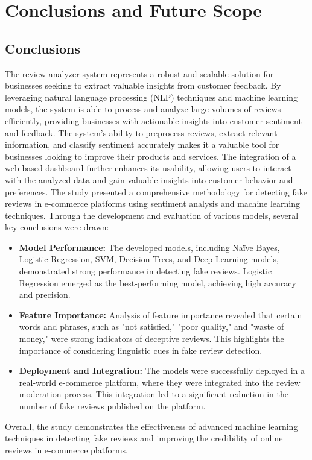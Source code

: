\chapter{Conclusions and Future Scope}
\section{Conclusions}
The review analyzer system represents a robust and scalable solution for businesses seeking to extract valuable insights from customer feedback. By leveraging natural language processing (NLP) techniques and machine learning models, the system is able to process and analyze large volumes of reviews efficiently, providing businesses with actionable insights into customer sentiment and feedback.
The system's ability to preprocess reviews, extract relevant information, and classify sentiment accurately makes it a valuable tool for businesses looking to improve their products and services. The integration of a web-based dashboard further enhances its usability, allowing users to interact with the analyzed data and gain valuable insights into customer behavior and preferences.
The study presented a comprehensive methodology for detecting fake reviews in e-commerce platforms using sentiment analysis and machine learning techniques. Through the development and evaluation of various models, several key conclusions were drawn:
\begin{itemize}
\item \textbf{Model Performance:} The developed models, including Naïve Bayes, Logistic Regression, SVM, Decision Trees, and Deep Learning models, demonstrated strong performance in detecting fake reviews. Logistic Regression emerged as the best-performing model, achieving high accuracy and precision.
\item \textbf{Feature Importance:} Analysis of feature importance revealed that certain words and phrases, such as "not satisfied," "poor quality," and "waste of money," were strong indicators of deceptive reviews. This highlights the importance of considering linguistic cues in fake review detection.
\item \textbf{Deployment and Integration:} The models were successfully deployed in a real-world e-commerce platform, where they were integrated into the review moderation process. This integration led to a significant reduction in the number of fake reviews published on the platform.
\end{itemize}
Overall, the study demonstrates the effectiveness of advanced machine learning techniques in detecting fake reviews and improving the credibility of online reviews in e-commerce platforms.
